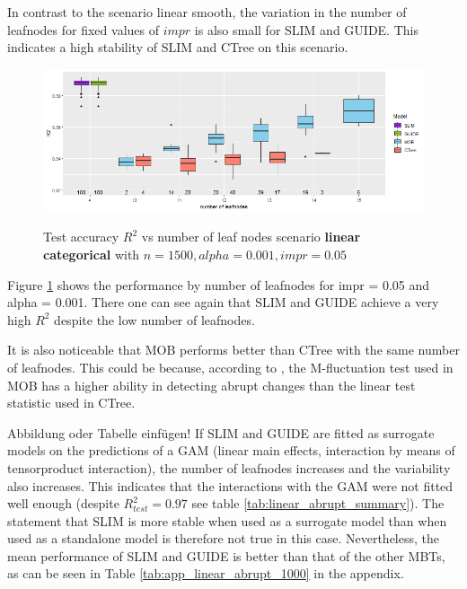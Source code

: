 In contrast to the scenario linear smooth, the variation in the number of leafnodes for fixed values of $impr$ is also small for SLIM and GUIDE. This indicates a high stability of SLIM and CTree on this scenario. 



\begin{figure}[!htb]
\caption{Test accuracy $R^2$ vs number of leaf nodes scenario \textbf{linear categorical} with $n=1500, alpha = 0.001, impr = 0.05$}
    \includegraphics[width=16cm]{Figures/simulations/batchtools/basic_scenarios/linear_abrupt/la_1000_standalone_r2_test.png}
    \label{fig:la_1000_standalone_r2_test}
\end{figure} 

Figure \ref{fig:la_1000_standalone_r2_test} shows the performance by number of leafnodes for impr = 0.05 and alpha = 0.001. There one can see again that SLIM and GUIDE achieve a very high $R^2$ despite the low number of leafnodes. 

It is also noticeable that MOB performs better than CTree with the same number of leafnodes.
This could be because, according to \citep{Schlosser.2019}, the M-fluctuation test used in MOB has a higher ability in detecting abrupt changes than the linear test statistic used in CTree.



\color{red}
Abbildung oder Tabelle einfügen!
\color{black}
If SLIM and GUIDE are fitted as surrogate models on the predictions of a GAM (linear main effects, interaction by means of tensorproduct interaction), the number of leafnodes increases and the variability also increases. This indicates that the interactions with the GAM were not fitted well enough (despite $R^2_{test} = 0.97$ see table \ref{tab:linear_abrupt_summary}). The statement that SLIM is more stable when used as a surrogate model than when used as a standalone model \citep{Hu.2020} is therefore not true in this case.
Nevertheless, the mean performance of SLIM and GUIDE is better than that of the other MBTs, as can be seen in Table \ref{tab:app_linear_abrupt_1000} in the appendix.




